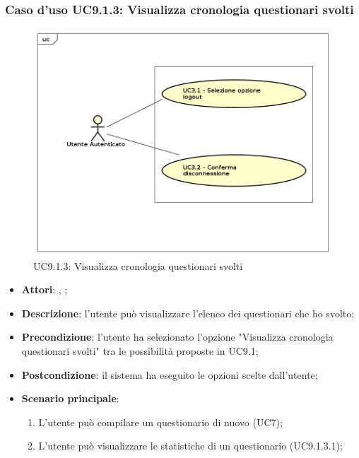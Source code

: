 		\subsubsection{Caso d'uso UC9.1.3: Visualizza cronologia questionari svolti}
		\label{UC9.1.3}
		\begin{figure}[h]
			\centering
			\includegraphics[scale=0.7,keepaspectratio]{UML/UC9.png}
			\caption{UC9.1.3: Visualizza cronologia questionari svolti}
		\end{figure}
		\FloatBarrier
		\begin{itemize}
			\item \textbf{Attori}: \uau, \uaupro;
			\item \textbf{Descrizione}: l'utente può visualizzare l'elenco dei questionari che ho svolto;
			\item \textbf{Precondizione}: l'utente ha selezionato l'opzione "Visualizza cronologia questionari svolti" tra le possibilità proposte in UC9.1;
			\item \textbf{Postcondizione}: il sistema ha eseguito le opzioni scelte dall'utente;
			\item \textbf{Scenario principale}: 
			\begin{enumerate}
				\item L'utente può compilare un questionario di nuovo (UC7);
				\item L'utente può visualizzare le statistiche di un questionario (UC9.1.3.1);
			\end{enumerate}
		\end{itemize}
		
